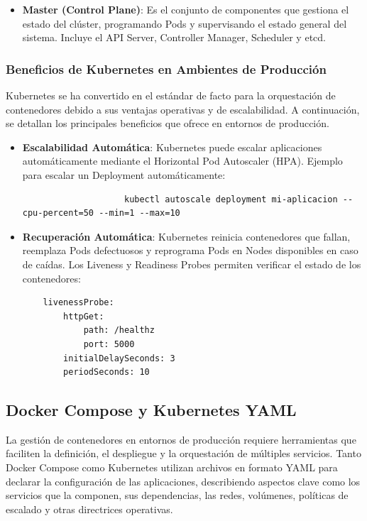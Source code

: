{\begin{itemize}
                    \item \textbf{Master (Control Plane)}: Es el conjunto de componentes que gestiona el estado del clúster, programando Pods y supervisando el estado general del sistema. Incluye el API Server, Controller Manager, Scheduler y etcd.
                \end{itemize}
            
            \subsubsection{Beneficios de Kubernetes en Ambientes de Producción}
                Kubernetes se ha convertido en el estándar de facto para la orquestación de contenedores debido a sus ventajas operativas y de escalabilidad. A continuación, se detallan los principales beneficios que ofrece en entornos de producción.

                \begin{itemize}
                    \item \textbf{Escalabilidad Automática}: Kubernetes puede escalar aplicaciones automáticamente mediante el Horizontal Pod Autoscaler (HPA). Ejemplo para escalar un Deployment automáticamente:
                
                    \begin{verbatim}
                    kubectl autoscale deployment mi-aplicacion --cpu-percent=50 --min=1 --max=10
                    \end{verbatim}
                
                    \item \textbf{Recuperación Automática}: Kubernetes reinicia contenedores que fallan, reemplaza Pods defectuosos y reprograma Pods en Nodes disponibles en caso de caídas. Los Liveness y Readiness Probes permiten verificar el estado de los contenedores:
                
                    \begin{verbatim}
    livenessProbe:
        httpGet:
            path: /healthz
            port: 5000
        initialDelaySeconds: 3
        periodSeconds: 10
                    \end{verbatim}
                \end{itemize}
            
            \subsection{Docker Compose y Kubernetes YAML}
                La gestión de contenedores en entornos de producción requiere herramientas que faciliten la definición, el despliegue y la orquestación de múltiples servicios. Tanto Docker Compose como Kubernetes utilizan archivos en formato YAML para declarar la configuración de las aplicaciones, describiendo aspectos clave como los servicios que la componen, sus dependencias, las redes, volúmenes, políticas de escalado y otras directrices operativas.

}
